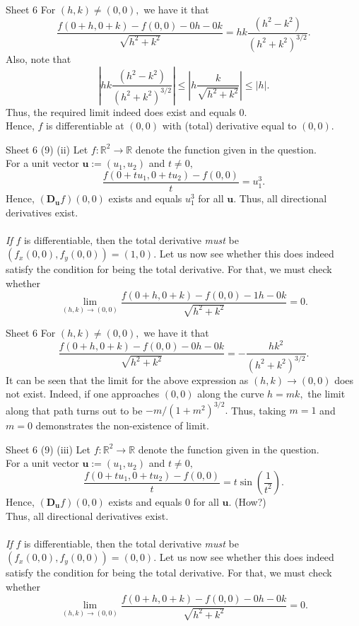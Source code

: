 \documentclass[handout, aspectratio=169]{beamer}
\begin{document}
\begin{frame}{Sheet 6}
	For $(h,k) \neq (0,0),$ we have it that
	\[\frac{f\left(0+h, 0+k\right)-f\left(0, 0\right)-0 h-0 k}{\sqrt{h^{2}+k^{2}}} = hk\frac{(h^2 - k^2)}{(h^2 + k^2)^{3/2}}.\]
	Also, note that
	\[\left|hk\frac{(h^2 - k^2)}{(h^2 + k^2)^{3/2}}\right| \le \left|h\frac{k}{\sqrt{h^2 + k^2}}\right| \le |h|.\]
	Thus, the required limit indeed does exist and equals $0.$\\
	Hence, $f$ is differentiable at $(0,0)$ with (total) derivative equal to $(0, 0).$
\end{frame}
\begin{frame}{Sheet 6}
	(9) (ii) Let $f:\mathbb{R}^2 \to \mathbb{R}$ denote the function given in the question.\\
	For a unit vector $\textbf{u} := (u_1, u_2)$ and $t \neq 0,$
	\[\frac{f\left(0+t u_{1}, 0+t u_{2}\right)-f(0,0)}{t} = u_1^3.\]
	Hence, $\left(\mathbf{D_u} f\right)(0,0)$ exists and equals $u_1^3$ for all $\textbf{u}.$ Thus, all directional derivatives exist.\\~\\
	\emph{If} $f$ is differentiable, then the total derivative \emph{must} be $(f_x(0, 0), f_y(0, 0)) = (1, 0).$ Let us now see whether this does indeed satisfy the condition for being the total derivative. For that, we must check whether
	\[\lim _{(h, k) \rightarrow(0,0)} \frac{f\left(0+h, 0+k\right)-f\left(0, 0\right)-1 h-0 k}{\sqrt{h^{2}+k^{2}}}=0.\]
\end{frame}
\begin{frame}{Sheet 6}
	For $(h,k) \neq (0,0),$ we have it that
	\[\frac{f\left(0+h, 0+k\right)-f\left(0, 0\right)-0 h-0 k}{\sqrt{h^{2}+k^{2}}} = -\frac{hk^2}{(h^2 + k^2)^{3/2}}.\]
	It can be seen that the limit for the above expression as $(h, k) \to (0, 0)$ does not exist. Indeed, if one approaches $(0, 0)$ along the curve $h = mk,$ the limit along that path turns out to be $-m/(1 + m^2)^{3/2}.$ Thus, taking $m = 1$ and $m = 0$ demonstrates the non-existence of limit.
\end{frame}
\begin{frame}{Sheet 6}
	(9) (iii) Let $f:\mathbb{R}^2 \to \mathbb{R}$ denote the function given in the question.\\
	For a unit vector $\textbf{u} := (u_1, u_2)$ and $t \neq 0,$
	\[\frac{f\left(0+t u_{1}, 0+t u_{2}\right)-f(0,0)}{t} = t\sin\left(\frac{1}{t^2}\right).\]
	Hence, $\left(\mathbf{D_u} f\right)(0,0)$ exists and equals $0$ for all $\textbf{u}.$ \hfill (How?)\\
	Thus, all directional derivatives exist.\\~\\
	\emph{If} $f$ is differentiable, then the total derivative \emph{must} be $(f_x(0, 0), f_y(0, 0)) = (0, 0).$ Let us now see whether this does indeed satisfy the condition for being the total derivative. For that, we must check whether
	\[\lim _{(h, k) \rightarrow(0,0)} \frac{f\left(0+h, 0+k\right)-f\left(0, 0\right)-0 h-0 k}{\sqrt{h^{2}+k^{2}}}=0.\]
\end{frame}
\end{document}

